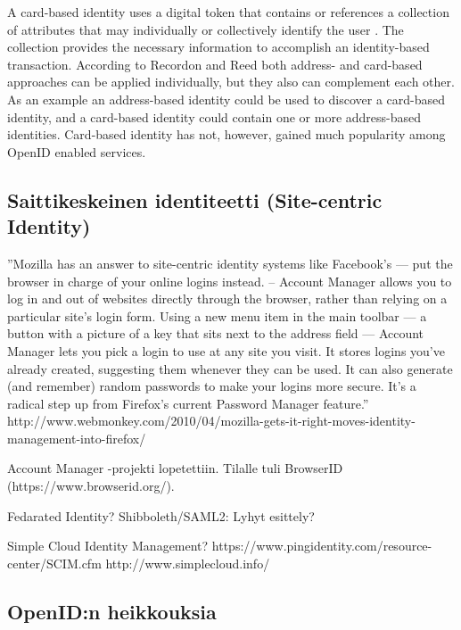 \documentclass[english,gradu]{tktltiki}
\begin{document}
A card-based identity uses a digital token that contains or references a collection of attributes that may individually or collectively identify the user \cite{openid_2.0_platform_2009}. The collection provides the necessary information to accomplish an identity-based transaction. According to Recordon and Reed \cite{openid_2.0_platform_2009} both address- and card-based approaches can be applied individually, but they also can complement each other. As an example an address-based identity could be used to discover a card-based identity, and a card-based identity could contain one or more address-based identities. Card-based identity has not, however, gained much popularity among OpenID enabled services.



\subsection{Saittikeskeinen identiteetti (Site-centric Identity)} %
\label{sub:saittikeskeinen_identiteetti_site_centric_identity_}
''Mozilla has an answer to site-centric identity systems like Facebook’s — put the browser in charge of your online logins instead. -- Account Manager allows you to log in and out of websites directly through the browser, rather than relying on a particular site’s login form. Using a new menu item in the main toolbar — a button with a picture of a key that sits next to the address field — Account Manager lets you pick a login to use at any site you visit. It stores logins you’ve already created, suggesting them whenever they can be used. It can also generate (and remember) random passwords to make your logins more secure. It’s a radical step up from Firefox’s current Password Manager feature.''
http://www.webmonkey.com/2010/04/mozilla-gets-it-right-moves-identity-management-into-firefox/

Account Manager -projekti lopetettiin. Tilalle tuli BrowserID (https://www.browserid.org/).

Fedarated Identity? Shibboleth/SAML2: Lyhyt esittely?

Simple Cloud Identity Management?
  https://www.pingidentity.com/resource-center/SCIM.cfm
  http://www.simplecloud.info/



\subsection{OpenID:n heikkouksia} %
\label{sub:openid_n_heikkouksia}
\end{document}
